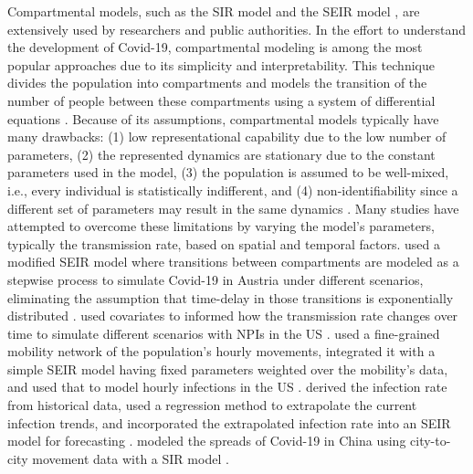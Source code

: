 Compartmental models, such as the SIR model and the SEIR model \cite{kermackContributionMathematicalTheory1927}, are extensively used by researchers and public authorities.
In the effort to understand the development of Covid-19, compartmental modeling is among the most popular approaches due to its simplicity and interpretability.
This technique divides the population into compartments and models the transition of the number of people between these compartments using a system of differential equations \cite{brauerCompartmentalModelsEpidemiology2008}.
Because of its assumptions, compartmental models typically have many drawbacks: (1) low representational capability due to the low number of parameters, (2) the represented dynamics are stationary due to the constant parameters used in the model, (3) the population is assumed to be well-mixed, i.e., every individual is statistically indifferent, and (4) non-identifiability since a different set of parameters may result in the same dynamics \cite{roosaAssessingParameterIdentifiability2019}.
Many studies have attempted to overcome these limitations by varying the model's parameters, typically the transmission rate, based on spatial and temporal factors.
\citeauthor{schneiderCOVID19PandemicPreparedness2020} used a modified SEIR model where transitions between compartments are modeled as a stepwise process to simulate Covid-19 in Austria under different scenarios, eliminating the assumption that time-delay in those transitions is exponentially distributed \cite{schneiderCOVID19PandemicPreparedness2020}.
\citeauthor{ihmecovid-19forecastingteamModelingCOVID19Scenarios2021} used covariates to informed how the transmission rate changes over time to simulate different scenarios with \glspl{NPI} in the \gls{US} \cite{ihmecovid-19forecastingteamModelingCOVID19Scenarios2021}.
\citeauthor{changMobilityNetworkModels2021} used a fine-grained mobility network of the population's hourly movements, integrated it with a simple SEIR model having fixed parameters weighted over the mobility's data, and used that to model hourly infections in the \gls{US} \cite{changMobilityNetworkModels2021}.
\citeauthor{chenTimeDependentSIRModel2020} derived the infection rate from historical data, used a regression method to extrapolate the current infection trends, and incorporated the extrapolated infection rate into an SEIR model for forecasting \cite{chenTimeDependentSIRModel2020}.
\citeauthor{liSubstantialUndocumentedInfection2020} modeled the spreads of Covid-19 in China using city-to-city movement data with a SIR model \cite{liSubstantialUndocumentedInfection2020}.

